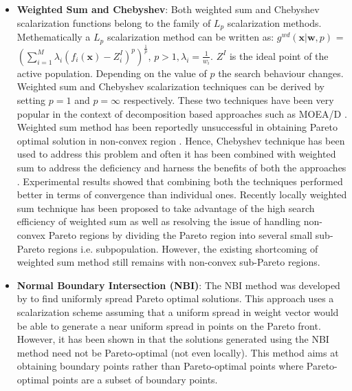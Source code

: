 \documentclass{sig-alternate}
\begin{document}
\begin{itemize}
	\item \textbf{Weighted Sum and Chebyshev}: Both weighted sum and Chebyshev scalarization functions belong to the family of $L_p$ scalarization methods. Methematically a $L_p$ scalarization method can be written as:
	$g^{wd}(\mathbf{x}|\mathbf{w},p)$ = $(\sum_{i=1}^M \lambda_i(f_i(\mathbf{x}) - Z^I_i)^p)^{\frac{1}{p}}$, $p > 1, \lambda_i = \frac{1}{w_i}$. $Z^I$ is the ideal point of the active population. Depending on the value of $p$ the search behaviour changes. Weighted sum and Chebyshev scalarization techniques can be derived by setting $p = 1$ and $p = \infty$ respectively. These two techniques have been very popular in the context of decomposition based approaches such as MOEA/D \cite{zhang2007moead}. Weighted sum method has been reportedly unsuccessful in obtaining Pareto optimal solution in non-convex region  \cite{miettinen2012nonlinear}. Hence, Chebyshev technique has been used to address this problem and often it has been combined with weighted sum to address the deficiency and harness the benefits of both the approaches \cite{ishibuchi2009adaptation}. Experimental results showed that combining both the techniques performed better in terms of convergence than individual ones. Recently locally weighted sum technique has been proposed to take advantage of the high search efficiency of weighted sum as well as resolving the issue of handling non-convex Pareto regions \cite{Wang2016ls} by dividing the Pareto region into several small sub-Pareto regions i.e. subpopulation. However, the existing shortcoming of weighted sum method still remains with non-convex sub-Pareto regions.  
	\item \textbf{Normal Boundary Intersection (NBI)}: The NBI method was developed by \cite{das1998normal} to find uniformly spread Pareto optimal solutions. This approach uses a scalarization scheme assuming that a uniform spread in weight vector would be able to generate a near uniform spread in points on the Pareto front. However, it has been shown in \cite{shukla2007nbi} that the solutions generated using the NBI method need not be Pareto-optimal (not even locally). This method aims at obtaining boundary points rather than Pareto-optimal points where Pareto-optimal points are a subset of boundary points. 

\end{itemize}
\end{document}
